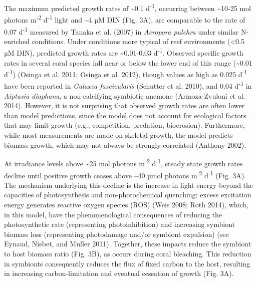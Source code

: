 \documentclass[]{elsarticle} %
\begin{document}
The maximum predicted growth rates of \textasciitilde{}0.1
d\textsuperscript{-1}, occurring between \textasciitilde{}10-25 mol
photons m\textsuperscript{-2} d\textsuperscript{-1} light and
\textasciitilde{}4 µM DIN (Fig. 3A), are comparable to the rate of 0.07
d\textsuperscript{-1} measured by Tanaka et al. (2007) in \emph{Acropora
pulchra} under similar N-enriched conditions. Under conditions more
typical of reef environments (\textless{}0.5 µM DIN), predicted growth
rates are \textasciitilde{}0.01-0.03 d\textsuperscript{-1}. Observed
specific growth rates in several coral species fall near or below the
lower end of this range (\textasciitilde{}0.01 d\textsuperscript{-1})
(Osinga et al. 2011; Osinga et al. 2012), though values as high as 0.025
d\textsuperscript{-1} have been reported in \emph{Galaxea fascicularis}
(Schutter et al. 2010), and 0.04 d\textsuperscript{-1} in \emph{Aiptasia
diaphana}, a non-calcifying symbiotic anemone (Armoza-Zvuloni et al.
2014). However, it is not surprising that observed growth rates are
often lower than model predictions, since the model does not account for
ecological factors that may limit growth (e.g., competition, predation,
bioerosion). Furthermore, while most measurements are made on skeletal
growth, the model predicts biomass growth, which may not always be
strongly correlated (Anthony 2002).

At irradiance levels above \textasciitilde{}25 mol photons
m\textsuperscript{-2} d\textsuperscript{-1}, steady state growth rates
decline until positive growth ceases above \textasciitilde{}40 µmol
photons m\textsuperscript{-2} d\textsuperscript{-1} (Fig. 3A). The
mechanism underlying this decline is the increase in light energy beyond
the capacities of photosynthesis and non-photochemical quenching: excess
excitation energy generates reactive oxygen species (ROS) (Weis 2008;
Roth 2014), which, in this model, have the phenomenological consequences
of reducing the photosynthetic rate (representing photoinhibition) and
increasing symbiont biomass loss (representing photodamage and/or
symbiont expulsion) (see Eynaud, Nisbet, and Muller 2011). Together,
these impacts reduce the symbiont to host biomass ratio (Fig. 3B), as
occurs during coral bleaching. This reduction in symbionts consequently
reduces the flux of fixed carbon to the host, resulting in increasing
carbon-limitation and eventual cessation of growth (Fig. 3A).
\end{document}
